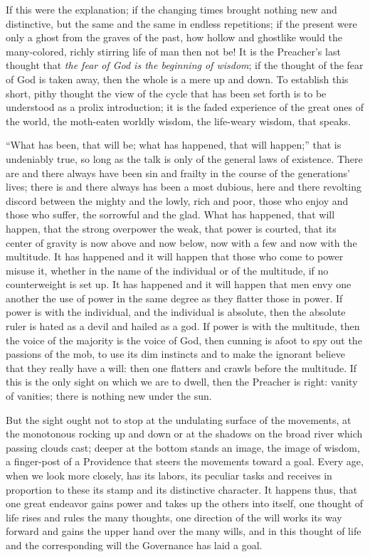 \documentclass[12pt,a4paper,openany]{book}
\newcommand{\opage}[1]{\marginnote{\footnotesize\textit{[#1]}}}
\begin{document}
If this were the explanation; if the changing
times brought nothing new and distinctive, but
the same and the same in endless repetitions;
if the present were only a ghost from the graves of the past,
how hollow and ghostlike
would the many-colored, richly stirring life of man then
not be! It is the Preacher's last thought that \emph{the fear of God is the beginning of wisdom}; if the thought of the fear of God is taken away,
then the whole is a mere up and down.
To establish this short, pithy thought the
view of the cycle that has been set forth is to be understood as
a prolix introduction; it is the faded experience of the great ones of the world,
the moth-eaten worldly wisdom, the life-weary
wisdom, that speaks.

``What has been, that will be; what has
happened, that will happen;'' that is undeniably true, so
long as the talk is only of the general laws of existence.
There are and there always have been sin and frailty
in the course of the generations' lives; there is and there always has
been a most dubious, here and there revolting discord
between the mighty and the lowly, rich and poor, those who enjoy
and those who suffer, the sorrowful and the glad. What has happened,
that will happen, that the strong overpower the weak, that
power is courted, that its center of gravity is now above
and now below, now with a few and now
\setcounter{footnote}{0}%
\opage{4}with the multitude. It has happened and it will happen that those
who come to power misuse it, whether in the name of the individual
or of the multitude, if no counterweight is set up.
It has happened and it will happen that men
envy one another the use of power in the same degree as
they flatter those in power. If power is with the individual,
and the individual is absolute, then the absolute ruler is
hated as a devil and hailed as a god.
If power is with the multitude, then the voice of the majority is the voice of
God, then cunning is afoot to spy out
the passions of the mob, to use its dim instincts and
to make the ignorant believe that they really have a will:
then one flatters and crawls before the multitude. If this is the only
sight on which we are to dwell, then the Preacher is
right: vanity of vanities; there is nothing
new under the sun.

But the sight ought not to stop at the undulating
surface of the movements, at the monotonous rocking up and
down or at the shadows on the broad river
which passing clouds cast; deeper at the bottom stands an
image, the image of wisdom, a finger-post of a Providence
that steers the movements toward a goal. Every age,
when we look more closely, has its labors, its
peculiar tasks and receives in proportion to these its stamp and
its distinctive character. It happens thus, that
one great endeavor gains power and takes up the others
into itself, one thought of life rises and rules the many
thoughts, one direction of the will works its way forward and gains the
upper hand over the many wills, and in this thought of life
and the corresponding will the Governance has laid a
goal.
\end{document}
